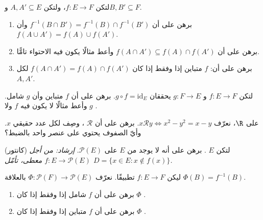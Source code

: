 \begin{exercise}[$\star\star$]\label{exo:b1:logic:8}
لتكن $f \colon E \to F$، ولتكن $A, A' \subseteq E$ و$B, B' \subseteq
F$.
\begin{enumerate}
  \item برهن على أن $f^{-1}(B \cap B') = f^{-1}(B) \cap f^{-1}(B')$ وأن
        $f(A \cup A') = f(A) \cup f(A')$.
  \item برهن على أن $f(A \cap A') \subseteq f(A) \cap f(A')$ وأعط
        مثالًا يكون فيه الاحتواء تامًّا.
  \item برهن على أن: $f$ متباين إذا وفقط إذا كان $f(A \cap A') = f(A)
        \cap f(A')$ لكل $A, A'$.
\end{enumerate}
\end{exercise}

\begin{exercise}[$\star\star$]\label{exo:b1:logic:9}
لتكن $f \colon E \to F$ و $g \colon F \to E$ يحققان $g \circ f =
\mathrm{id}_E$. برهن على أن $f$ متباين وأن $g$ شامل.
وأعط مثالًا لا يكون فيه $f$ ولا $g$ .
\end{exercise}

\begin{exercise}[$\star\star$]\label{exo:b1:logic:10}
على $\R$، نعرّف $x \mathbin{\mathcal{R}} y \iff x^2 - y^2 = x - y$.
برهن على أن $\mathcal{R}$ ، وصِف  لكل عدد
حقيقي $x$. وأيّ الصفوف يحتوي على عنصر واحد بالضبط؟
\end{exercise}

\begin{exercise}[$\star\star\star$]\label{exo:b1:logic:11}
(كانتور) لتكن $E$ . برهن على أنه لا يوجد  من $E$
على $\mathcal{P}(E)$. \emph{إرشاد: من أجل $f \colon E \to
\mathcal{P}(E)$ معطى، تأمّل $D = \{x \in E : x \notin f(x)\}$.}
\end{exercise}

\begin{exercise}[$\star\star\star$]\label{exo:b1:logic:12}
ليكن $f \colon E \to F$ تطبيقًا. نعرّف $\Phi \colon \mathcal{P}(F)
\to \mathcal{P}(E)$ بالعلاقة $\Phi(B) = f^{-1}(B)$.
\begin{enumerate}
  \item برهن على أن $f$ شامل إذا وفقط إذا كان $\Phi$ .
  \item برهن على أن $f$ متباين إذا وفقط إذا كان $\Phi$ .
\end{enumerate}
\end{exercise}

